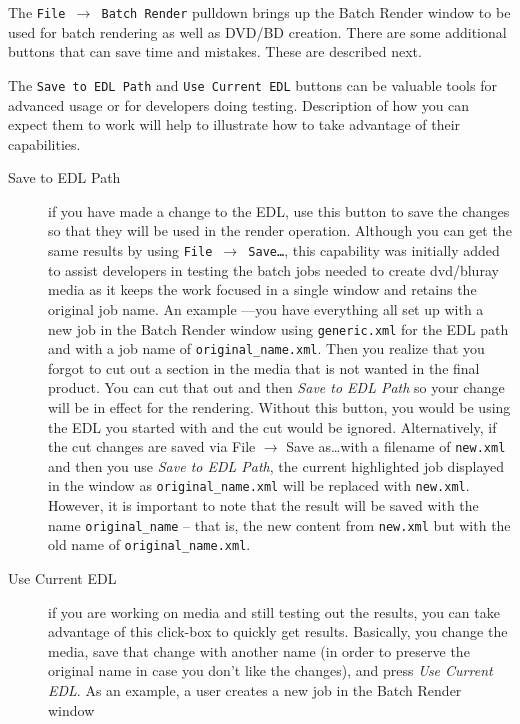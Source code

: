The \texttt{File $\rightarrow$ Batch Render} pulldown brings up the Batch Render window to be used for batch rendering as well as DVD/BD creation.  There are some additional buttons that can save time and mistakes.  These are described next.

The \texttt{Save to EDL Path} and \texttt{Use Current EDL} buttons can be valuable tools for advanced usage or for developers doing testing.  Description of how you can expect them to work will help to illustrate how to take advantage of their capabilities.

\begin{description}
    \item[Save to EDL Path] if you have made a change to the EDL, use this button to save the changes so
    that they will be used in the render operation.  Although you can get the same results by using
    \texttt{File  $\rightarrow$  Save\dots}, this capability was initially added to assist developers in testing the batch jobs needed
    to create dvd/bluray media as it keeps the work focused in a single window and retains the original
    job name.  An example ---you have everything all set up with a new job in the Batch Render window 
    using \texttt{generic.xml} for the EDL path and with a job name of \texttt{original\_name.xml}.  Then you realize
    that you forgot to cut out a section in the media that is not wanted in the final product.  You can cut 
    that out and then \textit{Save to EDL Path} so your change will be in effect for the rendering.  Without this
    button, you would be using the EDL you started with and the cut would be ignored.  Alternatively, if 
    the cut changes are saved via File  $\rightarrow$  Save as\dots with a filename of \texttt{new.xml} and then you use \textit{Save to EDL Path}, the current highlighted job displayed in the window as \texttt{original\_name.xml} will be 
    replaced with \texttt{new.xml}.  However, it is important to note that the result will be saved with the name
    \texttt{original\_name} – that is, the new content from \texttt{new.xml} but with the old name of \texttt{original\_name.xml}.
    \item[Use Current EDL] if you are working on media and still testing out the results, you can take
    advantage of this click-box to quickly get results.  Basically, you change the media, save that change 
    with another name (in order to preserve the original name in case you don't like the changes), and
    press \textit{Use Current EDL}.  As an example, a user creates a new job in the Batch Render window

\end{description}
